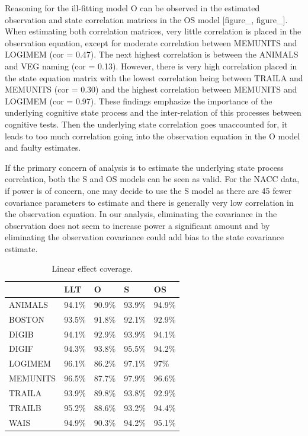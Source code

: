 \documentclass[
]{article}
\begin{document}
Reasoning for the ill-fitting model O can be observed in the estimated observation and state correlation matrices in the OS model {[}figure\_, figure\_{]}. When estimating both correlation matrices, very little correlation is placed in the observation equation, except for moderate correlation between MEMUNITS and LOGIMEM (cor = 0.47). The next highest correlation is between the ANIMALS and VEG naming (cor = 0.13). However, there is very high correlation placed in the state equation matrix with the lowest correlation being between TRAILA and MEMUNITS (cor = 0.30) and the highest correlation between MEMUNITS and LOGIMEM (cor = 0.97). These findings emphasize the importance of the underlying cognitive state process and the inter-relation of this processes between cognitive tests. Then the underlying state correlation goes unaccounted for, it leads to too much correlation going into the observation equation in the O model and faulty estimates.

If the primary concern of analysis is to estimate the underlying state process correlation, both the S and OS models can be seen as valid. For the NACC data, if power is of concern, one may decide to use the S model as there are 45 fewer covariance parameters to estimate and there is generally very low correlation in the observation equation. In our analysis, eliminating the covariance in the observation does not seem to increase power a significant amount and by eliminating the observation covariance could add bias to the state covariance estimate.

\begin{table}

\caption{\label{tab:unnamed-chunk-33}Linear effect coverage.}
\centering
\begin{tabular}[t]{lllll}
\toprule
  & LLT & O & S & OS\\
\midrule
ANIMALS & 94.1\% & 90.9\% & 93.9\% & 94.9\%\\
BOSTON & 93.5\% & 91.8\% & 92.1\% & 92.9\%\\
DIGIB & 94.1\% & 92.9\% & 93.9\% & 94.1\%\\
DIGIF & 94.3\% & 93.8\% & 95.5\% & 94.2\%\\
LOGIMEM & 96.1\% & 86.2\% & 97.1\% & 97\%\\
\addlinespace
MEMUNITS & 96.5\% & 87.7\% & 97.9\% & 96.6\%\\
TRAILA & 93.9\% & 89.8\% & 93.8\% & 92.9\%\\
TRAILB & 95.2\% & 88.6\% & 93.2\% & 94.4\%\\
WAIS & 94.9\% & 90.3\% & 94.2\% & 95.1\%\\
\bottomrule
\end{tabular}
\end{table}
\end{document}
